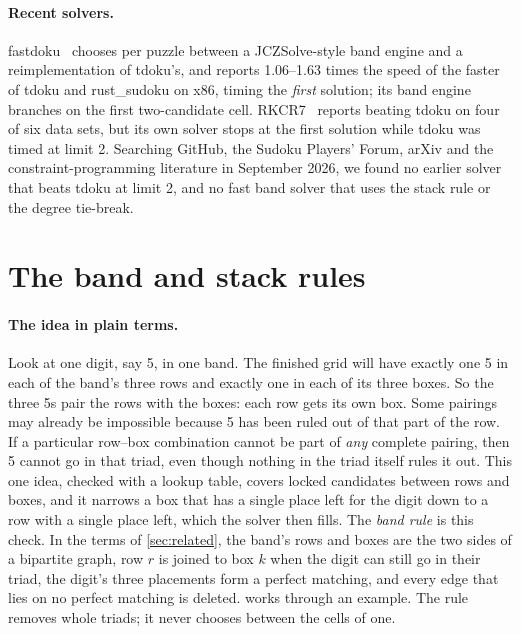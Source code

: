 \documentclass[11pt]{article}
\theoremstyle{definition}
\theoremstyle{plain}
\begin{document}
\paragraph{Recent solvers.} fastdoku~\cite{rocketbombs2026fastdoku} chooses per puzzle between a JCZSolve-style band
engine and a reimplementation of tdoku's, and reports 1.06--1.63 times the speed of the faster of tdoku and
rust\_sudoku on x86, timing the \emph{first} solution; its band engine branches on the first two-candidate cell.
RKCR7~\cite{rkcr7_2026autoresearch} reports beating tdoku on four of six data sets, but its own solver stops at the
first solution while tdoku was timed at limit 2. Searching GitHub, the Sudoku Players' Forum, arXiv and the
constraint-programming literature in September 2026, we found no earlier solver that beats tdoku at limit 2, and no
fast band solver that uses the stack rule or the degree tie-break.

\section{The band and stack rules}
\label{sec:rules}

\paragraph{The idea in plain terms.} Look at one digit, say 5, in one band. The finished grid will have exactly one 5
in each of the band's three rows and exactly one in each of its three boxes. So the three 5s pair the rows with the
boxes: each row gets its own box. Some pairings may already be impossible because 5 has been ruled out of that part of
the row. If a particular row--box combination cannot be part of \emph{any} complete pairing, then 5 cannot go in that
triad, even though nothing in the triad itself rules it out. This one idea, checked with a lookup table,
covers locked candidates between rows and boxes, and it narrows a box that has a single place left for the digit down
to a row with a single place left, which the solver then fills. The \emph{band rule} is this check. In the terms of
\cref{sec:related}, the band's rows and boxes are the two sides of a bipartite graph, row $r$ is joined to box $k$ when
the digit can still go in their triad, the digit's three placements form a perfect matching, and every edge that lies
on no perfect matching is deleted.  works through an example. The rule removes whole triads; it never
chooses between the cells of one.
\end{document}

